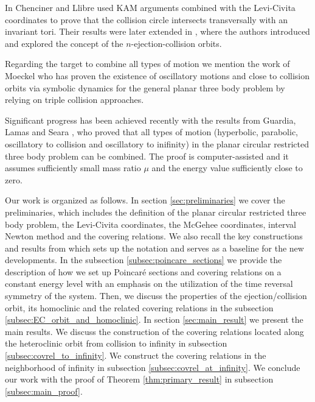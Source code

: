 \documentclass[1p]{article}
\begin{document}
In \cite{MR0967629} Chenciner and Llibre used KAM arguments combined with the Levi-Civita coordinates to prove that the collision circle intersects transversally with an invariant tori. Their results were later extended in \cite{OLLE2018298,OLLE2020105294,seara2022}, where the authors introduced and explored the concept of the $n$-ejection-collision orbits.

Regarding the target to combine all types of motion we mention the work of Moeckel \cite{MR2350333} who has proven the existence of oscillatory motions and close to collision orbits via symbolic dynamics for the general planar three body problem by relying on triple collision approaches.

Significant progress has been achieved recently with the results from Guardia, Lamas and Seara \cite{MR4890942}, who proved that all types of motion (hyperbolic, parabolic, oscillatory to collision and oscillatory to inifinity) in the planar circular restricted three body problem can be combined. The proof is computer-assisted and it assumes sufficiently small mass ratio $\mu$ and the energy value sufficiently close to zero.

Our work is organized as follows. In section \ref{sec:preliminaries} we cover the preliminaries, which includes the definition of the planar circular restricted three body problem, the Levi-Civita coordinates, the McGehee coordinates, interval Newton method and the covering relations. We also recall the key constructions and results from \cite{CAPINSKI2026109173} which sets up the notation and serves as a baseline for the new developments. In the subsection \ref{subsec:poincare_sections} we provide the description of how we set up Poincar\'e sections and covering relations on a constant energy level with an emphasis on the utilization of the time reversal symmetry of the system. Then, we discuss the properties of the ejection/collision orbit, its homoclinic and the related covering relations in the subsection \ref{subsec:EC_orbit_and_homoclinic}. In section \ref{sec:main_result} we present the main results. We discuss the construction of the covering relations located along the heteroclinic orbit from collision to infinity in subsection \ref{subsec:covrel_to_infinity}. We construct the covering relations in the neighborhood of infinity in subsection \ref{subsec:covrel_at_infinity}. We conclude our work with the proof of Theorem \ref{thm:primary_result} in subsection \ref{subsec:main_proof}.
\end{document}
